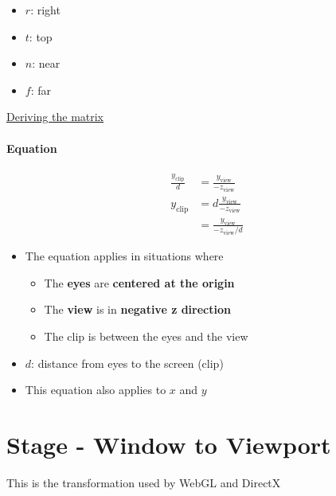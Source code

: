     \begin{itemize}
      \item $ r $: right
      \item $ t $: top
      \item $ n $: near
      \item $ f $: far
    \end{itemize}

    \href{http://www.songho.ca/opengl/gl_projectionmatrix.html}{Deriving
    the matrix}

    \paragraph{Equation}
    \begin{align}
      \frac{y_{\text{clip}}}{d} &= \frac{y_{\text{view}}}{-z_{\text{view}}} \\
      y_{\text{clip}}
      &= d\frac{y_ {\text{view}}}{-z_{\text{view}}} \\
      &= \frac{y_{\text{view}}}{-z_{\text{view}} / d}
    \end{align}

    \begin{itemize}
      \item The equation applies in situations where
      \begin{itemize}
        \item The \textbf{eyes} are \textbf{centered at the origin}
        \item The \textbf{view} is in \textbf{negative z direction}
        \item The clip is between the eyes and the view
      \end{itemize}

      \item $ d $: distance from eyes to the screen (clip)
      \item This equation also applies to $ x $ and $ y $
    \end{itemize}

\section{Stage - Window to Viewport}

  This is the transformation used by WebGL and DirectX


